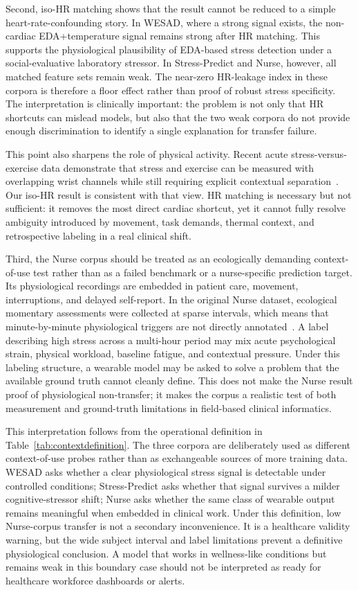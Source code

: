 \documentclass[healthcare,article,submit,moreauthors,pdftex]{Definitions/mdpi}
\begin{document}
Second, iso-HR matching shows that the result cannot be reduced to a simple
heart-rate-confounding story. In WESAD, where a strong signal exists, the
non-cardiac EDA+temperature signal remains strong after HR matching. This supports
the physiological plausibility of EDA-based stress detection under a
social-evaluative laboratory stressor. In Stress-Predict and Nurse, however, all
matched feature sets remain weak. The near-zero HR-leakage index in these corpora
is therefore a floor effect rather than proof of robust stress specificity. The
interpretation is clinically important: the problem is not only that HR shortcuts
can mislead models, but also that the two weak corpora do not provide enough
discrimination to identify a single explanation for transfer failure.

This point also sharpens the role of physical activity. Recent acute
stress-versus-exercise data demonstrate that stress and exercise can be measured
with overlapping wrist channels while still requiring explicit contextual
separation~\cite{hongn2025wearable}. Our iso-HR result is consistent with that
view. HR matching is necessary but not sufficient: it removes the most direct
cardiac shortcut, yet it cannot fully resolve ambiguity introduced by movement,
task demands, thermal context, and retrospective labeling in a real clinical
shift.

Third, the Nurse corpus should be treated as an ecologically demanding
context-of-use test rather than as a failed benchmark or a nurse-specific
prediction target. Its physiological recordings are embedded in patient care,
movement, interruptions, and delayed self-report. In the original Nurse dataset,
ecological momentary assessments were collected at sparse intervals, which means
that minute-by-minute physiological triggers are not directly
annotated~\cite{hosseini2022nurse}. A label describing high stress across a
multi-hour period may mix acute psychological strain, physical workload, baseline
fatigue, and contextual pressure. Under this labeling structure, a wearable model
may be asked to solve a problem that the available ground truth cannot cleanly
define. This does not make the Nurse result proof of physiological non-transfer;
it makes the corpus a realistic test of both measurement and ground-truth
limitations in field-based clinical informatics.

This interpretation follows from the operational definition in
Table~\ref{tab:contextdefinition}. The three corpora are deliberately used as
different context-of-use probes rather than as exchangeable sources of more
training data. WESAD asks whether a clear physiological stress signal is
detectable under controlled conditions; Stress-Predict asks whether that signal
survives a milder cognitive-stressor shift; Nurse asks whether the same class of
wearable output remains meaningful when embedded in clinical work. Under this
definition, low Nurse-corpus transfer is not a secondary inconvenience. It is a
healthcare validity warning, but the wide subject interval and label limitations
prevent a definitive physiological conclusion. A model that works in
wellness-like conditions but remains weak in this boundary case should not be
interpreted as ready for healthcare workforce dashboards or alerts.
\end{document}

